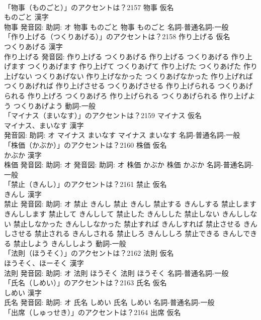 \documentclass[8pt]{extreport}
\begin{document}
\begin{CJK}{UTF8}{min}
\\	「物事（ものごと）」のアクセントは？2157	物事 仮名　
\\	ものごと 漢字　
\\	物事 発音図: 助詞: オ	物事 ものごと		物事 ものごと				名詞-普通名詞-一般 
\\	「作り上げる（つくりあげる）」のアクセントは？2158	作り上げる 仮名　
\\	つくりあげる 漢字　
\\	作り上げる 発音図:	作り上げる つくりあげる		作り上げる つくりあげる 作り上げます つくりあげます 作り上げて つくりあげて 作り上げた つくりあげた 作り上げない つくりあげない 作り上げなかった つくりあげなかった 作り上げれば つくりあげれば 作り上げさせる つくりあげさせる 作り上げられる つくりあげられる 作り上げろ つくりあげろ 作り上げられる つくりあげられる 作り上げよう つくりあげよう				動詞-一般 
\\	「マイナス（まいなす）」のアクセントは？2159	マイナス 仮名　
\\	マイナス、まいなす 漢字　
\\	発音図: 助詞: オ	マイナス まいなす		マイナス まいなす				名詞-普通名詞-一般 
\\	「株価（かぶか）」のアクセントは？2160	株価 仮名　
\\	かぶか 漢字　
\\	株価 発音図: 助詞: オ 発音図: 助詞: オ	株価 かぶか		株価 かぶか				名詞-普通名詞-一般 
\\	「禁止（きんし）」のアクセントは？2161	禁止 仮名　
\\	きんし 漢字　
\\	禁止 発音図: 助詞: オ	禁止 きんし		禁止 きんし 禁止する きんしする 禁止します きんしします 禁止して きんしして 禁止した きんしした 禁止しない きんししない 禁止しなかった きんししなかった 禁止すれば きんしすれば 禁止させる きんしさせる 禁止される きんしされる 禁止しろ きんししろ 禁止できる きんしできる 禁止しよう きんししよう				動詞-一般 
\\	「法則（ほうそく）」のアクセントは？2162	法則 仮名　
\\	ほうそく、ほーそく 漢字　
\\	法則 発音図: 助詞: オ	法則 ほうそく		法則 ほうそく				名詞-普通名詞-一般 
\\	「氏名（しめい）」のアクセントは？2163	氏名 仮名　
\\	しめい 漢字　
\\	氏名 発音図: 助詞: オ	氏名 しめい		氏名 しめい				名詞-普通名詞-一般 
\\	「出席（しゅっせき）」のアクセントは？2164	出席 仮名　

\end{CJK}
\end{document}
